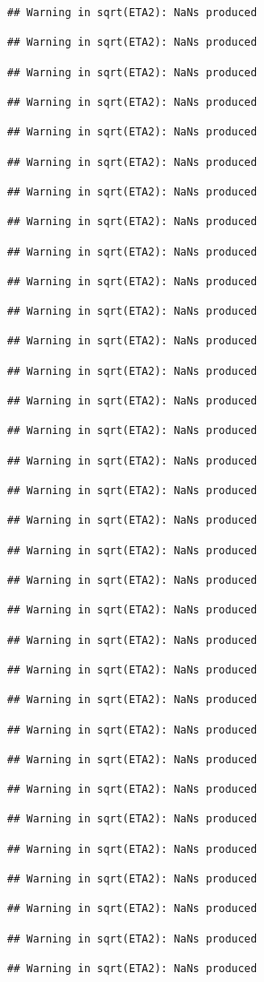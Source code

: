\documentclass[
]{article}
\begin{document}
\begin{verbatim}
## Warning in sqrt(ETA2): NaNs produced

## Warning in sqrt(ETA2): NaNs produced

## Warning in sqrt(ETA2): NaNs produced

## Warning in sqrt(ETA2): NaNs produced

## Warning in sqrt(ETA2): NaNs produced

## Warning in sqrt(ETA2): NaNs produced

## Warning in sqrt(ETA2): NaNs produced

## Warning in sqrt(ETA2): NaNs produced

## Warning in sqrt(ETA2): NaNs produced

## Warning in sqrt(ETA2): NaNs produced

## Warning in sqrt(ETA2): NaNs produced

## Warning in sqrt(ETA2): NaNs produced

## Warning in sqrt(ETA2): NaNs produced

## Warning in sqrt(ETA2): NaNs produced

## Warning in sqrt(ETA2): NaNs produced

## Warning in sqrt(ETA2): NaNs produced

## Warning in sqrt(ETA2): NaNs produced

## Warning in sqrt(ETA2): NaNs produced

## Warning in sqrt(ETA2): NaNs produced

## Warning in sqrt(ETA2): NaNs produced

## Warning in sqrt(ETA2): NaNs produced

## Warning in sqrt(ETA2): NaNs produced

## Warning in sqrt(ETA2): NaNs produced

## Warning in sqrt(ETA2): NaNs produced

## Warning in sqrt(ETA2): NaNs produced

## Warning in sqrt(ETA2): NaNs produced

## Warning in sqrt(ETA2): NaNs produced

## Warning in sqrt(ETA2): NaNs produced

## Warning in sqrt(ETA2): NaNs produced

## Warning in sqrt(ETA2): NaNs produced

## Warning in sqrt(ETA2): NaNs produced

## Warning in sqrt(ETA2): NaNs produced

## Warning in sqrt(ETA2): NaNs produced


\end{verbatim}
\end{document}

